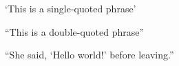 `This is a single-quoted phrase'

``This is a double-quoted phrase''

``She said, `Hello world!' before leaving.''